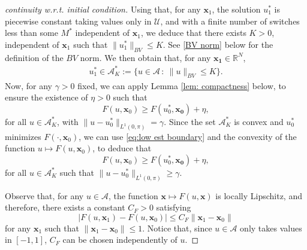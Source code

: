 \documentclass[twocolumn]{autart}    %
\begin{document}
\begin{proof}[continuity w.r.t. initial condition]
	Using that, for any $\bm{x}_1$, the solution $u_1^\ast$ is piecewise constant taking values only in $\mathcal{U}$, and with a finite number of switches less than some $M^\ast$ independent of $\bm{x}_1$,  we deduce that there exists $K>0$, independent of $\bm{x}_1$ such that $\| u_1^\ast\|_{BV} \leq K$. See \eqref{BV norm} below for the definition of the $BV$ norm. We then obtain that, for any $\bm{x_1}\in \mathbb{R}^N$,
	\begin{align*}
		u_1^\ast\in \mathcal{A}_K^\ast:= \{ u\in \mathcal{A}\, : \ \| u\|_{BV} \leq K \}.
	\end{align*}
	Now, for any $\gamma>0$ fixed, we can apply Lemma \ref{lem: compactness} below, to ensure the existence of $\eta>0$ such that
	\begin{equation}\label{eq:low est boundary}
		F(u, \bm{x}_0)  \geq F(u_0^\ast, \bm{x_0})  + \eta,
	\end{equation}
	for all $u\in \mathcal{A}_K^\ast$, with $\| u-u_0^\ast\|_{L^1(0,\pi)} =\gamma$. Since the set $\mathcal{A}_K^\ast$ is convex and $u_0^\ast$ minimizes $F(\cdot , \bm{x}_0)$, we can use \eqref{eq:low est boundary} and the convexity of the function $u\mapsto F(u, \bm{x}_0)$, to deduce that
	\begin{equation}\label{eq:low est outside}
		F(u, \bm{x}_0)  \geq F(u_0^\ast, \bm{x_0})  + \eta,
	\end{equation}
	for all $u\in \mathcal{A}_K^\ast$ such that  $\| u-u_0^\ast\|_{L^1(0,\pi)} \geq \gamma$.
	
	Observe that, for any $u\in \mathcal{A}$, the function $\bm{x} \mapsto F(u, \bm{x})$  is  locally Lipschitz, and therefore,  there exists a constant $C_F>0$ satisfying
	\begin{equation}\label{eq:F Lipschitz}
		|F(u,  \bm{x}_1) -  F(u,  \bm{x}_0) |\leq  C_F \| \bm{x}_1 - \bm{x}_0\|
	\end{equation}
	for any  $\bm{x}_1$ such that $\| \bm{x}_1-\bm{x}_0\| \leq 1$. Notice that, since $u\in\mathcal{A}$ only takes values in $[-1,1]$, $C_F$ can be chosen independently of $u$.
	

\end{proof}
\end{document}
